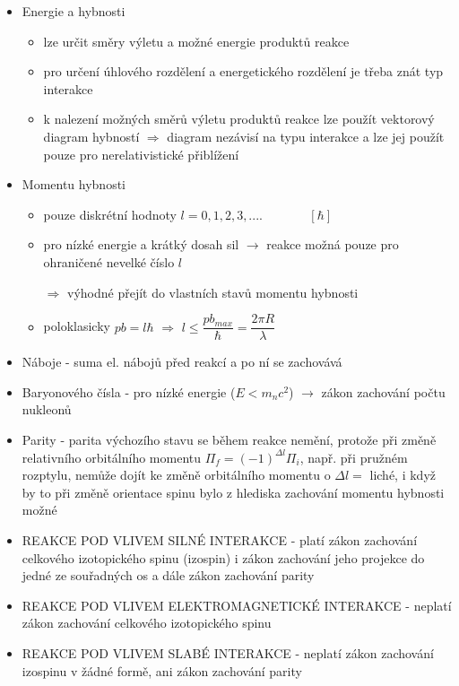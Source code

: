 \documentclass[../../main.tex]{subfiles}
\begin{document}
\begin{itemize}
	\item Energie a hybnosti 
	\begin{itemize}
		\item lze určit směry výletu a možné energie produktů reakce
		\item pro určení úhlového rozdělení a energetického rozdělení je třeba znát typ interakce
		\item k nalezení možných směrů výletu produktů reakce lze použít vektorový diagram hybností $\Rightarrow$ diagram nezávisí na typu interakce a lze jej použít pouze pro nerelativistické přiblížení
	\end{itemize}
	\item Momentu hybnosti
	\begin{itemize}
		\item pouze diskrétní hodnoty $l =0,1,2,3,....$ ~~~~~~ $[\hbar]$
		\item pro nízké energie a krátký dosah sil $\rightarrow$ reakce možná pouze pro ohraničené nevelké číslo $l$
		
		$\Rightarrow$ výhodné přejít do vlastních stavů momentu hybnosti
		\item poloklasicky  $p b =l \hbar$ $\Rightarrow$ $l \leq \dfrac{p b_{max}}{\hbar} = \dfrac{2 \pi R}{\lambda}$ 
	\end{itemize}
	\item Náboje - suma el. nábojů před reakcí a po ní se zachovává
	\item Baryonového čísla - pro nízké energie ($E < m_n c^2$) $\rightarrow$ zákon zachování  počtu nukleonů
	\item Parity - parita výchozího stavu se během reakce nemění, protože při změně relativního orbitálního momentu $\Pi_f = (-1)^{\Delta l}\Pi_i$, např. při pružném rozptylu, nemůže dojít ke změně orbitálního momentu o $\Delta l =$ liché, i když by to při změně orientace spinu bylo z hlediska zachování momentu hybnosti možné
	
	\item REAKCE POD VLIVEM SILNÉ INTERAKCE - platí zákon zachování celkového izotopického spinu (izospin) i zákon zachování jeho projekce do jedné ze souřadných os a dále zákon zachování parity
	\item REAKCE POD VLIVEM ELEKTROMAGNETICKÉ INTERAKCE - neplatí zákon zachování celkového izotopického spinu
	\item REAKCE POD VLIVEM SLABÉ INTERAKCE - neplatí zákon zachování izospinu v žádné formě, ani zákon zachování parity
\end{itemize}
\end{document}
